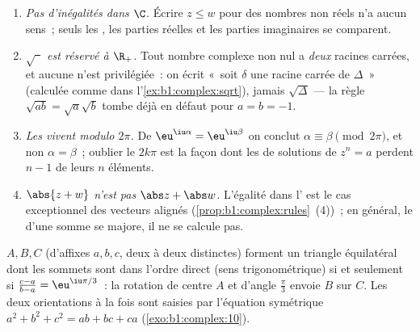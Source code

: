\begin{remark}\label{rem:b1:complex:pitfalls}
\begin{enumerate}
  \item \emph{Pas d'inégalités dans $\C$.} Écrire $z \leq w$ pour
        des nombres non réels n'a aucun sens~; seuls les ,
        les parties réelles et les parties imaginaires se
        comparent.
  \item \emph{$\sqrt{\phantom z}$ est réservé à $\R_+$.} Tout
        nombre complexe non nul a \emph{deux} racines carrées, et
        aucune n'est privilégiée~: on écrit «~soit $\delta$ une
        racine carrée de $\Delta$~» (calculée comme dans
        l'\cref{ex:b1:complex:sqrt}), jamais $\sqrt\Delta$ --- la
        règle $\sqrt{ab} = \sqrt a\sqrt b$ tombe déjà en défaut
        pour $a = b = -1$.
  \item \emph{Les  vivent modulo $2\pi$.} De
        $\eu^{\iu\alpha} = \eu^{\iu\beta}$ on conclut $\alpha
        \equiv \beta \pmod{2\pi}$, et non $\alpha = \beta$~;
        oublier le $2k\pi$ est la façon dont les  de
        solutions de $z^n = a$ perdent $n - 1$ de leurs $n$
        éléments.
  \item \emph{$\abs{z + w}$ n'est pas $\abs z + \abs w$.}
        L'égalité dans l' est le cas
        exceptionnel des vecteurs alignés
        (\cref{prop:b1:complex:rules}~(4))~; en général, le 
        d'une somme se majore, il ne se calcule pas.
\end{enumerate}
\end{remark}

\begin{example}\label{ex:b1:complex:equilateral}
$A, B, C$ (d'affixes $a, b, c$, deux à deux distinctes) forment un
triangle équilatéral dont les sommets sont dans l'ordre direct (sens
trigonométrique) si et seulement si $\frac{c - a}{b - a} =
\eu^{\iu\pi/3}$~: la rotation de centre $A$ et d'angle $\frac\pi3$
envoie $B$ sur $C$. Les deux orientations à la fois sont saisies par
l'équation symétrique $a^2 + b^2 + c^2 = ab + bc + ca$
(\cref{exo:b1:complex:10}).
\end{example}

